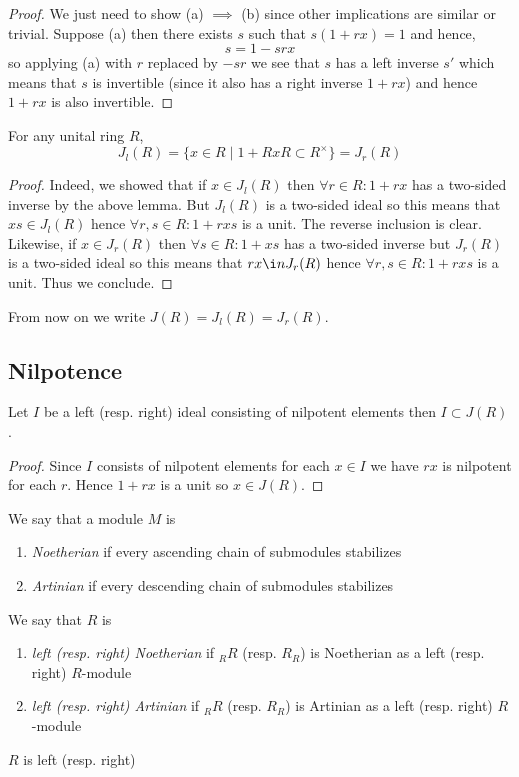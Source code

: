 \documentclass[12pt]{article}
\begin{document}
\begin{proof}
We just need to show (a) $\implies$ (b) since other implications are similar or trivial. Suppose (a) then there exists $s$ such that $s(1 + rx) = 1$ and hence,
\[ s = 1 - srx \]
so applying (a) with $r$ replaced by $-sr$ we see that $s$ has a left inverse $s'$ which means that $s$ is invertible (since it also has a right inverse $1 + rx$) and hence $1 + rx$ is also invertible.
\end{proof}

\begin{theorem}
For any unital ring $R$,
\[ J_l(R) = \{ x \in R \mid 1 + R x R \subset R^\times \} = J_r(R) \]
\end{theorem}

\begin{proof}
Indeed, we showed that if $x \in J_l(R)$ then $\forall r \in R : 1 + rx$ has a two-sided inverse by the above lemma. But $J_l(R)$ is a two-sided ideal so this means that $x s \in J_l(R)$ hence $\forall r,s \in R : 1 + rxs$ is a unit. The reverse inclusion is clear. Likewise, if $x \in J_r(R)$ then $\forall s \in R : 1 + x s$ has a two-sided inverse but $J_r(R)$ is a two-sided ideal so this means that $r x \i nJ_r(R)$ hence $\forall r, s \in R : 1 + rxs$ is a unit. Thus we conclude.
\end{proof}

From now on we write $J(R) = J_l(R) = J_r(R)$.

\subsection{Nilpotence}

\begin{prop}
Let $I$ be a left (resp. right) ideal consisting of nilpotent elements then $I \subset J(R)$.
\end{prop}

\begin{proof}
Since $I$ consists of nilpotent elements for each $x \in I$ we have $rx$ is nilpotent for each $r$. Hence $1 + rx$ is a unit so $x \in J(R)$.
\end{proof}

\begin{defn}
We say that a module $M$ is
\begin{enumerate}
\item \textit{Noetherian} if every ascending chain of submodules stabilizes
\item \textit{Artinian} if every descending chain of submodules stabilizes
\end{enumerate}
We say that $R$ is
\begin{enumerate}
\item \textit{left (resp. right) Noetherian} if ${}_R R$ (resp. $R_{R}$) is Noetherian as a left (resp. right) $R$-module
\item \textit{left (resp. right) Artinian} if ${}_R R$ (resp. $R_{R}$) is Artinian as a left (resp. right) $R$-module
\end{enumerate} $R$ is left (resp. right)
\end{defn}
\end{document}
